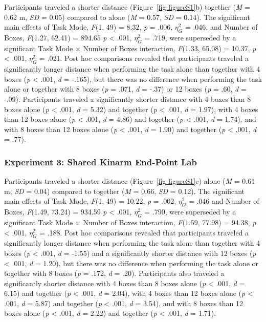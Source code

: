 \documentclass[
  11pt,
  letterpaper,
]{article}
\renewcommand{\emph}[1]{\textit{#1}}  %
\begin{document}
Participants traveled a shorter distance (Figure~\ref{fig-figureS1}b)
together (\emph{M} = 0.62 m, \emph{SD} = 0.05) compared to alone
(\emph{M} = 0.57, \emph{SD} = 0.14). The significant main effects of
Task Mode, \emph{F}(1, 49) = 8.32, \emph{p} = .006, \(\eta_{G}^{2}\) =
.046, and Number of Boxes, \emph{F}(1.27, 62.41) = 894.65 \emph{p}
\textless{} .001, \(\eta_{G}^{2}\) = .719, were superseded by a
significant Task Mode × Number of Boxes interaction, \emph{F}(1.33,
65.08) = 10.37, \emph{p} \textless{} .001, \(\eta_{G}^{2}\) = .021. Post
hoc comparisons revealed that participants traveled a significantly
longer distance when performing the task alone than together with 4
boxes (\emph{p} \textless{} .001, \emph{d} = -.165), but there was no
difference when performing the task alone or together with 8 boxes
(\emph{p} = .071, \emph{d} = -.37) or 12 boxes (\emph{p} = .60, \emph{d}
= -.09). Participants traveled a significantly shorter distance with 4
boxes than 8 boxes alone (\emph{p} \textless{} .001, \emph{d} = 5.32)
and together (\emph{p} \textless{} .001, \emph{d} = 1.97), with 4 boxes
than 12 boxes alone (\emph{p} \textless{} .001, \emph{d} = 4.86) and
together (\emph{p} \textless{} .001, \emph{d} = 1.74), and with 8 boxes
than 12 boxes alone (\emph{p} \textless{} .001, \emph{d} = 1.90) and
together (\emph{p} \textless{} .001, \emph{d} = .77).

\subsubsection{Experiment 3: Shared Kinarm End-Point
Lab}\label{experiment-3-shared-kinarm-end-point-lab-1}

Participants traveled a shorter distance (Figure~\ref{fig-figureS1}c)
alone (\emph{M} = 0.61 m, \emph{SD} = 0.04) compared to together
(\emph{M} = 0.66, \emph{SD} = 0.12). The significant main effects of
Task Mode, \emph{F}(1, 49) = 10.22, \emph{p} = .002, \(\eta_{G}^{2}\) =
.046 and Number of Boxes, \emph{F}(1.49, 73.24) = 934.59 \emph{p}
\textless{} .001, \(\eta_{G}^{2}\) = .790, were superseded by a
significant Task Mode × Number of Boxes interaction, \emph{F}(1.59,
77.98) = 94.38, \emph{p} \textless{} .001, \(\eta_{G}^{2}\) = .188. Post
hoc comparisons revealed that participants traveled a significantly
longer distance when performing the task alone than together with 4
boxes (\emph{p} \textless{} .001, \emph{d} = -1.55) and a significantly
shorter distance with 12 boxes (\emph{p} \textless{} .001, \emph{d} =
1.20), but there was no difference when performing the task alone or
together with 8 boxes (\emph{p} = .172, \emph{d} = .20). Participants
also traveled a significantly shorter distance with 4 boxes than 8 boxes
alone (\emph{p} \textless{} .001, \emph{d} = 6.15) and together
(\emph{p} \textless{} .001, \emph{d} = 2.04), with 4 boxes than 12 boxes
alone (\emph{p} \textless{} .001, \emph{d} = 5.87) and together
(\emph{p} \textless{} .001, \emph{d} = 3.54), and with 8 boxes than 12
boxes alone (\emph{p} \textless{} .001, \emph{d} = 2.22) and together
(\emph{p} \textless{} .001, \emph{d} = 1.71).
\end{document}
